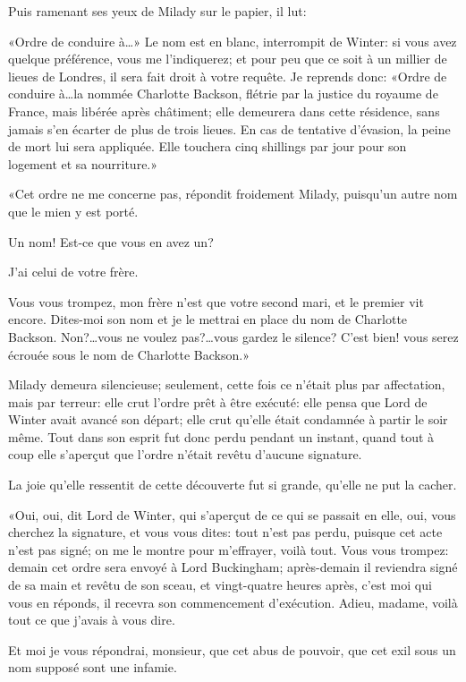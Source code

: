 Puis ramenant ses yeux de Milady sur le papier, il lut: 

«Ordre de conduire à\dots» Le nom est en blanc, interrompit de Winter: si vous avez quelque préférence, vous me l'indiquerez; et pour peu que ce soit à un millier de lieues de Londres, il sera fait droit à votre requête. Je reprends donc: «Ordre de conduire à\dots la nommée Charlotte Backson, flétrie par la justice du royaume de France, mais libérée après châtiment; elle demeurera dans cette résidence, sans jamais s'en écarter de plus de trois lieues. En cas de tentative d'évasion, la peine de mort lui sera appliquée. Elle touchera cinq shillings par jour pour son logement et sa nourriture.» 

«Cet ordre ne me concerne pas, répondit froidement Milady, puisqu'un autre nom que le mien y est porté. 

\speak  Un nom! Est-ce que vous en avez un? 

\speak  J'ai celui de votre frère. 

\speak  Vous vous trompez, mon frère n'est que votre second mari, et le premier vit encore. Dites-moi son nom et je le mettrai en place du nom de Charlotte Backson. Non?\dots vous ne voulez pas?\dots vous gardez le silence? C'est bien! vous serez écrouée sous le nom de Charlotte Backson.» 

Milady demeura silencieuse; seulement, cette fois ce n'était plus par affectation, mais par terreur: elle crut l'ordre prêt à être exécuté: elle pensa que Lord de Winter avait avancé son départ; elle crut qu'elle était condamnée à partir le soir même. Tout dans son esprit fut donc perdu pendant un instant, quand tout à coup elle s'aperçut que l'ordre n'était revêtu d'aucune signature. 

La joie qu'elle ressentit de cette découverte fut si grande, qu'elle ne put la cacher. 

«Oui, oui, dit Lord de Winter, qui s'aperçut de ce qui se passait en elle, oui, vous cherchez la signature, et vous vous dites: tout n'est pas perdu, puisque cet acte n'est pas signé; on me le montre pour m'effrayer, voilà tout. Vous vous trompez: demain cet ordre sera envoyé à Lord Buckingham; après-demain il reviendra signé de sa main et revêtu de son sceau, et vingt-quatre heures après, c'est moi qui vous en réponds, il recevra son commencement d'exécution. Adieu, madame, voilà tout ce que j'avais à vous dire. 

\speak  Et moi je vous répondrai, monsieur, que cet abus de pouvoir, que cet exil sous un nom supposé sont une infamie. 

